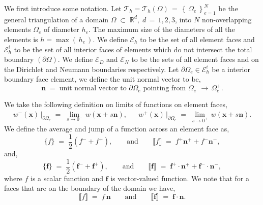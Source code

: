 \documentclass[10pt]{report}
\numberwithin{equation}{section}
\begin{document}
We first introduce some notation. Let $\mathcal{T}_{h} = \mathcal{T}_{h}(\Omega) \, = \, \left\{ \, \Omega_{e} \, \right\}_{e=1}^{N}$ be  the general triangulation of a domain $\Omega \; \subset \; \mathbb{R}^{d}, \; d \, = \, 1, 2, 3$, into $N$ non-overlapping elements $\Omega_{e}$ of diameter $h_{e}$.  The maximum size of the diameters of all the elements is $h = \max( \, h_{e}\, )$.  We define $\mathcal{E}_{h}$ to be the set of all element faces and $\mathcal{E}_{h}^{i} $ to be the set of all interior faces of elements which do not intersect the total boundary $(\partial \Omega)$. We define $\mathcal{E}_{D}$ and $\mathcal{E}_{N}$ to be the sets of all element faces and on the Dirichlet and Neumann boundaries respectively. Let $\partial \Omega_{e} \in \mathcal{E}_{h}^{i}$ be a interior boundary face element, we define the unit normal vector to be,
\begin{equation}
\textbf{n} \; = \; \text{unit normal vector to } \partial \Omega_{e}  \text{ pointing from } \Omega_{e}^{-} \, \rightarrow  \, \Omega_{e}^{+}.
\end{equation}


\noindent
We take the following definition on limits of functions on element faces,
\begin{align}
w^{-} (\textbf{x} ) \, \vert_{\partial \Omega_{e} } \; = \; \lim_{s \rightarrow 0^{-}} \, w(\textbf{x}  +  s  \textbf{n}),  && w^{+} (\textbf{x} ) \, \vert_{\partial \Omega_{e} } \; = \; \lim_{s \rightarrow 0^{+}} \, w(\textbf{x}  + s  \textbf{n}).
\end{align} 
\noindent
We define the average and jump of a function across an element face as,
\begin{equation}
\{f\} \; = \; \frac{1}{2}(f^-+f^+), 
\qquad \mbox{and} \qquad 
\llbracket f \rrbracket \; = \; f^+ \textbf{n}^+ + f^- \textbf{n}^-,
\end{equation}
\noindent
and,
\begin{equation}
\{\textbf{f} \} \; = \; \frac{1}{2}(\textbf{f}^- + \textbf{f}^+), 
\qquad \mbox{and}\qquad  
\llbracket \textbf{f} \rrbracket \; = \;\textbf{f}^+ \cdot \textbf{n}^+ + \textbf{f}^- \cdot \textbf{n}^- , 
\end{equation}
\noindent
where $f$ is a scalar function and $\textbf{f}$ is vector-valued function. We note that for a faces that are on the boundary of the domain we have,
\begin{equation}
\llbracket f \rrbracket \; = \; f \,  \textbf{n} 
\qquad \mbox{and}\qquad  
\llbracket \textbf{f} \rrbracket \; = \; \textbf{f} \cdot \textbf{n}.
\end{equation}
\end{document}
